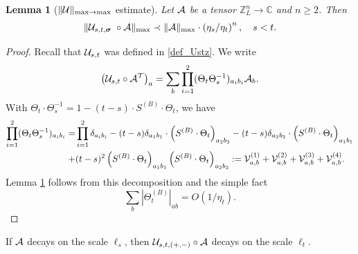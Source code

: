 \documentclass[10pt,reqno]{article}
\theoremstyle{plain} %
\newtheorem{lemma}[theorem]{Lemma}
\theoremstyle{remark}
\numberwithin{equation}{section}
\begin{document}
\begin{lemma}[$\|{\cal U}\|_{\max\to \max}$ estimate]\label{lem:sum_Ndecay}
Let $\cal A$ be a tensor $\mathbb Z_L^n\to \mathbb C$ and $n\ge 2$.  
Then 
\begin{align}\label{sum_res_Ndecay}
   \| {\cal U}_{s,t,\boldsymbol{\sigma}}\;\circ {\cal A}\|_{\max } \prec \|{\cal A}\|_{\max}
    \cdot \left(  \eta_s/ \eta_t\right)^{n } ,\quad s<t. 
\end{align}
\end{lemma}
\begin{proof} 
Recall that ${\cal U}_{s, t}$ was defined in \ref{def_Ustz}.  We  write  
$$
\left({\cal U}_{s, t}\circ {\cal A}^{\cal T}\right)_{\textbf{a}} =\sum_{\textbf{b}} \prod_{i=1}^2 (\Theta_{t  }\Theta^{-1}_{s })_{a_ib_i}
{\cal A}_{\textbf{b}}.
$$
With $ \Theta_t\cdot \Theta_{s}^{-1}=1-(t-s)\cdot S^{(B)}\cdot \Theta_t $,  we have 
\begin{align}\nonumber
  \prod_{i=1}^2  (\Theta_{t  }\Theta^{-1}_{s })_{a_ib_i}
  = &  \prod_{i=1}^2 \delta_{a_ib_i}
  -(t-s) \delta_{a_1b_1}\cdot \left(S^{(B)}\cdot \Theta_t\right)_{a_2b_2}
 -(t-s) \delta_{a_2b_2}\cdot \left(S^{(B)}\cdot \Theta_t\right)_{a_1b_1}
 \\\label{ajzuis}
 + &(t-s)^2   \left(S^{(B)}\cdot \Theta_t\right)_{a_1b_1}\left(S^{(B)}\cdot \Theta_t\right)_{a_2b_2}  
 := {\cal V} ^{(1)}_{\textbf{a}, \textbf{b}}+ {\cal V} ^{(2)}_{\textbf{a}, \textbf{b}}+ {\cal V} ^{(3)}_{\textbf{a}, \textbf{b}}+ {\cal V} ^{(4)}_{\textbf{a}, \textbf{b}}.
\end{align}
Lemma \ref{lem:sum_Ndecay} follows from this decomposition and the simple fact 
$$
\sum_{b}\left|\Theta^{(B)}_{t}\right|_{ab}=O\left(1/\eta_t\right). 
$$
\end{proof}

If $\cal A $ decays on the scale $\ell_s$, then ${\cal U}_{s,t, (+,-)}\circ \cal A$ decays on the scale $\ell_t$. 
\end{document}

